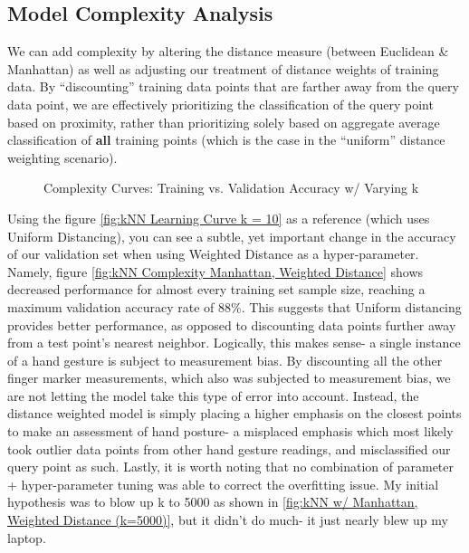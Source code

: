 \documentclass[letterpaper,12pt]{article}
\begin{document}
\subsection{Model Complexity Analysis}
We can add complexity by altering the distance measure (between Euclidean \& Manhattan) as well as adjusting our treatment of distance weights of training data.  By ``discounting'' training data points that are farther away from the query data point, we are effectively prioritizing the classification of the query point based on proximity, rather than prioritizing solely based on aggregate average classification of \textbf{all} training points (which is the case in the ``uniform'' distance weighting scenario).  

\begin{figure} %
  \centering
  \hspace{8pt}%
  \caption{Complexity Curves:  Training vs. Validation Accuracy w/ Varying k }\label{fig:kNN Complexity Curves}

 
\end{figure}

Using the figure \ref{fig:kNN Learning Curve k = 10} as a reference (which uses Uniform Distancing), you can see a subtle, yet important change in the accuracy of our validation set when using Weighted Distance as a hyper-parameter.  Namely, figure \ref{fig:kNN Complexity Manhattan, Weighted Distance} shows decreased performance for almost every training set sample size, reaching a maximum validation accuracy rate of 88\%.  This suggests that Uniform distancing provides better performance, as opposed to discounting data points further away from a test point's nearest neighbor.  Logically, this makes sense- a single instance of a hand gesture is subject to measurement bias.  By discounting all the other finger marker measurements, which also was subjected to measurement bias, we are not letting the model take this type of error into account.  Instead, the distance weighted model is simply placing a higher emphasis on the closest points to make an assessment of hand posture- a misplaced emphasis which most likely took outlier data points from other hand gesture readings, and misclassified our query point as such.  Lastly, it is worth noting that no combination of parameter + hyper-parameter tuning was able to correct the overfitting issue.  My initial hypothesis was to blow up k to 5000 as shown in \ref{fig:kNN w/ Manhattan, Weighted Distance (k=5000)}, but it didn't do much- it just nearly blew up my laptop.  
\end{document}
